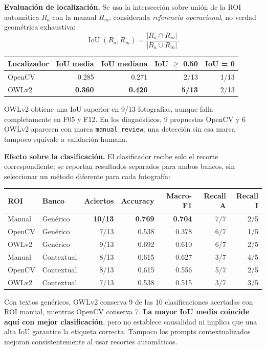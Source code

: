 \documentclass[10pt,a4paper]{article}
\begin{document}
\textbf{Evaluación de localización.} Se usa la intersección sobre unión de la ROI automática $R_a$ con la manual $R_m$, considerada \emph{referencia operacional}, no verdad geométrica exhaustiva:
\begin{equation*}
\operatorname{IoU}(R_a,R_m)=\frac{|R_a\cap R_m|}{|R_a\cup R_m|}.
\end{equation*}
\begin{center}
\small
\begin{tabular}{@{}lrrrr@{}}
\toprule
\textbf{Localizador} & \textbf{IoU media} & \textbf{IoU mediana} & \textbf{IoU $\geq$ 0.50} & \textbf{IoU = 0}\\
\midrule
OpenCV & 0.285 & 0.271 & 2/13 & 1/13\\
\rowcolor{light} OWLv2 & \textbf{0.360} & \textbf{0.426} & \textbf{5/13} & 2/13\\
\bottomrule
\end{tabular}
\end{center}
OWLv2 obtiene una IoU superior en 9/13 fotografías, aunque falla completamente en F05 y F12. En los diagnósticos, 9 propuestas OpenCV y 6 OWLv2 aparecen con marca \texttt{manual\_review}; una detección sin esa marca tampoco equivale a validación humana.

\textbf{Efecto sobre la clasificación.} El clasificador recibe solo el recorte correspondiente; se reportan resultados separados para ambos bancos, sin seleccionar un método diferente para cada fotografía:
\begin{center}
\small
\begin{tabular}{@{}llrrrrr@{}}
\toprule
\textbf{ROI} & \textbf{Banco} & \textbf{Aciertos} & \textbf{Accuracy} & \textbf{Macro-F1} & \textbf{Recall A} & \textbf{Recall I}\\
\midrule
\rowcolor{light} Manual & Genérico & \textbf{10/13} & \textbf{0.769} & \textbf{0.704} & 7/7 & 2/5\\
OpenCV & Genérico & 7/13 & 0.538 & 0.378 & 6/7 & 1/5\\
OWLv2 & Genérico & 9/13 & 0.692 & 0.610 & 6/7 & 2/5\\
\midrule
Manual & Contextual & 8/13 & 0.615 & 0.627 & 3/7 & 4/5\\
OpenCV & Contextual & 8/13 & 0.615 & 0.556 & 5/7 & 2/5\\
OWLv2 & Contextual & 7/13 & 0.538 & 0.515 & 3/7 & 3/5\\
\bottomrule
\end{tabular}
\end{center}
Con textos genéricos, OWLv2 conserva 9 de las 10 clasificaciones acertadas con ROI manual, mientras OpenCV conserva 7. \textbf{La mayor IoU media coincide aquí con mejor clasificación}, pero no establece causalidad ni implica que una alta IoU garantice la etiqueta correcta. Tampoco los prompts contextualizados mejoran consistentemente al usar recortes automáticos.
\end{document}

